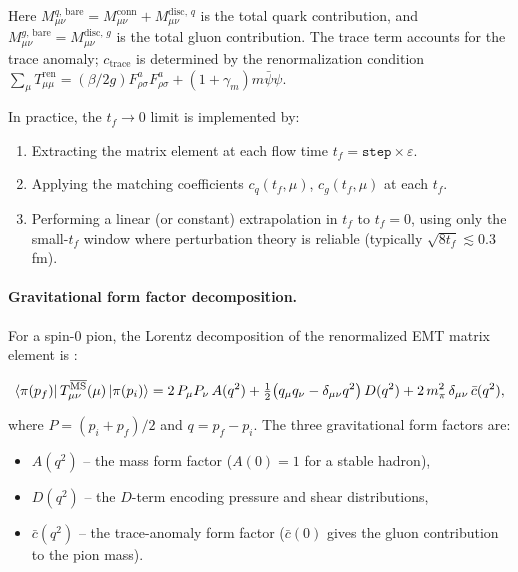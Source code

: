 \documentclass[11pt,a4paper]{article}
\newcommand{\code}[1]{\texttt{#1}}
\begin{document}
Here $M_{\mu\nu}^{q,\,\text{bare}} = M_{\mu\nu}^{\text{conn}} + M_{\mu\nu}^{\text{disc},\,q}$ is the total quark contribution,
and $M_{\mu\nu}^{g,\,\text{bare}} = M_{\mu\nu}^{\text{disc},\,g}$ is the total gluon contribution.
The trace term accounts for the trace anomaly; $c_{\text{trace}}$ is determined by the
renormalization condition $\sum_\mu T_{\mu\mu}^{\text{ren}} = (\beta/2g) F_{\rho\sigma}^a F_{\rho\sigma}^a
+ (1+\gamma_m) m \bar{\psi}\psi$.

In practice, the $t_f \to 0$ limit is implemented by:
\begin{enumerate}[nosep]
  \item Extracting the matrix element at each flow time $t_f = \code{step} \times \varepsilon$.
  \item Applying the matching coefficients $c_q(t_f, \mu)$, $c_g(t_f, \mu)$ at each $t_f$.
  \item Performing a linear (or constant) extrapolation in $t_f$ to $t_f = 0$,
    using only the small-$t_f$ window where perturbation theory is reliable
    (typically $\sqrt{8t_f} \lesssim 0.3$\,fm).
\end{enumerate}

\paragraph{Gravitational form factor decomposition.}
For a spin-0 pion, the Lorentz decomposition of the renormalized EMT matrix element is
\cite{DelDebbio:2021}:

\begin{equation}\label{eq:GFF_decomp}
  \bra{\pi(p_f)} T_{\mu\nu}^{\overline{\text{MS}}}(\mu) \ket{\pi(p_i)}
    = 2\,P_\mu P_\nu\, A(q^2)
    + \tfrac{1}{2}\big(q_\mu q_\nu - \delta_{\mu\nu} q^2\big)\, D(q^2)
    + 2\,m_\pi^2\,\delta_{\mu\nu}\, \bar{c}(q^2),
\end{equation}

where $P = (p_i + p_f)/2$ and $q = p_f - p_i$.
The three gravitational form factors are:
\begin{itemize}[nosep]
  \item $A(q^2)$ -- the mass form factor ($A(0) = 1$ for a stable hadron),
  \item $D(q^2)$ -- the $D$-term encoding pressure and shear distributions,
  \item $\bar{c}(q^2)$ -- the trace-anomaly form factor ($\bar{c}(0)$ gives the gluon
    contribution to the pion mass).
\end{itemize}
\end{document}

